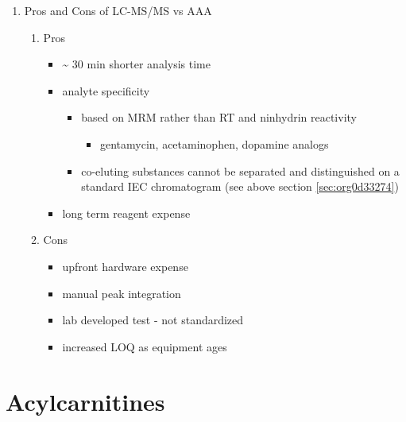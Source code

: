\documentclass{scrartcl}
\begin{document}
\begin{enumerate}
\item Pros and Cons of LC-MS/MS vs AAA
\label{sec:orgf8ac031}
\begin{enumerate}
\item Pros
\label{sec:org518cf7e}
\begin{itemize}
\item \textasciitilde{} 30 min shorter analysis time
\item analyte specificity
\begin{itemize}
\item based on MRM rather than RT and ninhydrin reactivity
\begin{itemize}
\item gentamycin, acetaminophen, dopamine analogs
\end{itemize}
\item co-eluting substances cannot be separated and distinguished on a
standard IEC chromatogram (see above section \ref{sec:org0d33274})
\end{itemize}
\item long term reagent expense
\end{itemize}

\item Cons
\label{sec:orgd9f8f9b}
\begin{itemize}
\item upfront hardware expense
\item manual peak integration
\item lab developed test - not standardized
\item increased LOQ as equipment ages
\end{itemize}
\end{enumerate}
\end{enumerate}
\section{Acylcarnitines}
\label{sec:org7356fb6}
\end{document}
